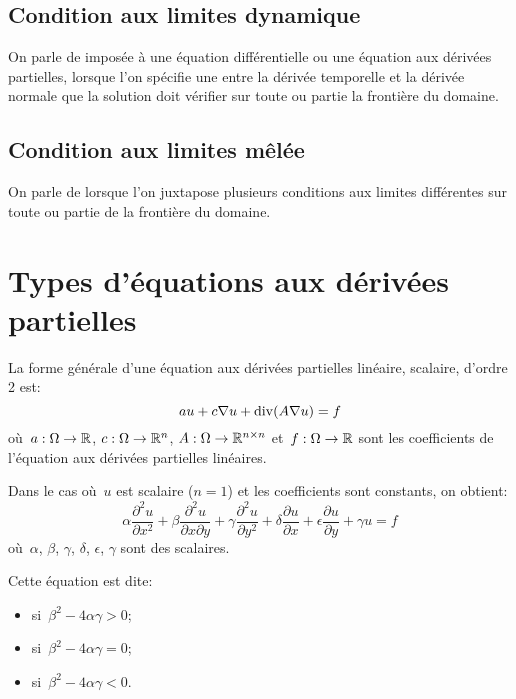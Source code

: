 \medskip
\subsection{Condition aux limites dynamique}

On parle de  imposée à une équation différentielle ou une équation aux dérivées partielles,
lorsque l'on spécifie une  entre la dérivée temporelle et 
la dérivée normale que la solution doit vérifier sur toute ou partie la frontière du 
domaine.

\medskip
\subsection{Condition aux limites mêlée}

On parle de  lorsque l'on juxtapose
plusieurs conditions aux limites différentes sur toute ou partie de la frontière du 
domaine.






\medskip
\section{Types d'équations aux dérivées partielles}

La forme générale d'une équation aux dérivées partielles linéaire, scalaire, d'ordre 2 est:
\begin{equation}
au + c \nabla u + \operatorname{div} (A\nabla u) = f
\end{equation}
où~$a: \Omega\rightarrow\mathbb R$, $c: \Omega\rightarrow\mathbb R^n$, 
$A: \Omega\rightarrow\mathbb R^{n\times n}$ et~$f: \Omega\rightarrow\mathbb R$ sont
les coefficients de l'équation aux dérivées partielles linéaires.

\medskip
Dans le cas où~$u$ est scalaire ($n = 1$) et les coefficients sont constants, on obtient:
\begin{equation}
\alpha\dfrac{\partial^2 u}{\partial x^2}+\beta\dfrac{\partial^2 u}{\partial x\partial y}
+\gamma \dfrac{\partial^2 u}{\partial y^2} + \delta \dfrac{\partial u}{\partial x}
+ \epsilon \dfrac{\partial u}{\partial y} +\gamma u = f
\end{equation}
où~$\alpha$, $\beta$, $\gamma$, $\delta$, $\epsilon$, $\gamma$ sont des scalaires.

Cette équation est dite:
\begin{itemize}
  \item {} si~$\beta^2-4\alpha\gamma>0$;
  \item {} si~$\beta^2-4\alpha\gamma=0$;
  \item {} si~$\beta^2-4\alpha\gamma<0$.
\end{itemize}

